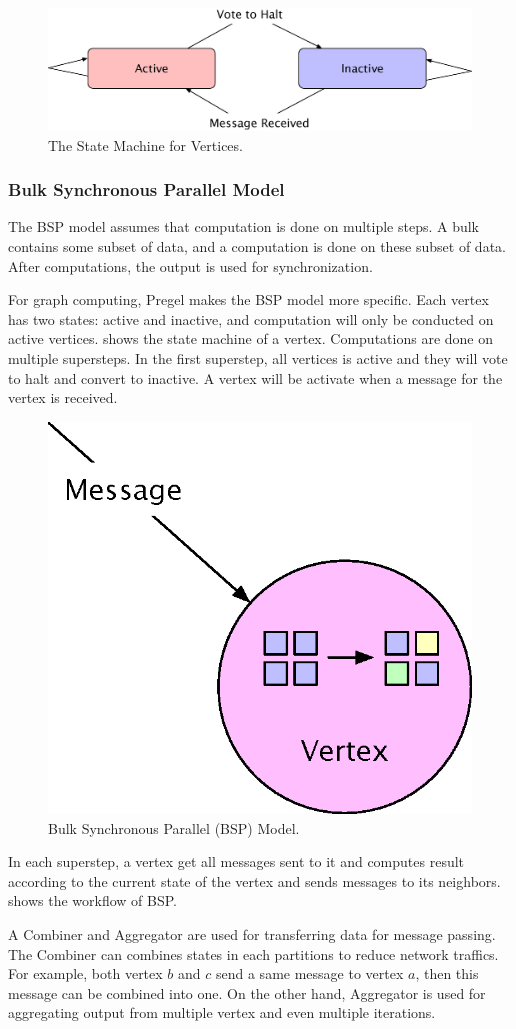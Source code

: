 \begin{figure}[tbh]
  \center
  \includegraphics[width=.8\linewidth]{figures/state}
  \caption{The State Machine for Vertices.}
  \label{fig:state}
\end{figure}

\subsubsection{Bulk Synchronous Parallel Model}
The BSP model assumes that computation is done on multiple steps. A bulk contains
some subset of data, and a computation is done on these subset of data. After
computations, the output is used for synchronization.

For graph computing, Pregel makes the BSP model more specific.
Each vertex has two states: active and inactive, and computation
will only be conducted on active vertices.  shows the
state machine of a vertex. Computations are done on multiple
supersteps. In the first superstep, all vertices is active and they
will vote to halt and convert to inactive. A vertex will be activate
when a message for the vertex is received.

\begin{figure}
  \center
  \includegraphics[width=.25\textwidth]{figures/bsp}
  \caption{Bulk Synchronous Parallel (BSP) Model.}
  \label{fig:bsp}
\end{figure}

In each superstep, a vertex get all messages sent to it and computes
result according to the current state of the vertex and sends messages
to its neighbors.  shows the workflow of BSP.

A Combiner and Aggregator are used for transferring data for message
passing. The Combiner can combines states in each partitions to reduce
network traffics. For example, both vertex $b$ and $c$ send a same
message to vertex $a$, then this message can be combined into one.
On the other hand, Aggregator is used for aggregating output from multiple
vertex and even multiple iterations.

